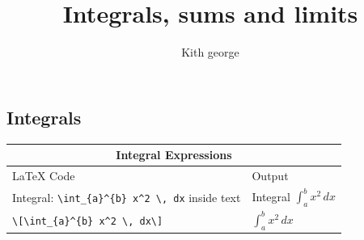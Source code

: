 \documentclass{article}
\title{Integrals, sums and limits}
\author{Kith george}
\begin{document}
	\maketitle
	
	\subsection*{Integrals}
	\begin{tabular}{|l|l|}
		\hline 
		\multicolumn{2}{|c|}{Integral Expressions} \\
		\hline
		LaTeX Code &Output \\
		\hline
		Integral: \verb|\int_{a}^{b} x^2 \, dx| inside text &
		Integral \(\int_{a}^{b} x^2 \, dx\) \\
		\hline
		\verb|\[\int_{a}^{b} x^2 \, dx\]| &
		$\displaystyle \int_{a}^{b} x^2 \, dx$ \\
		\hline
		
		
	\end{tabular}
\end{document}
